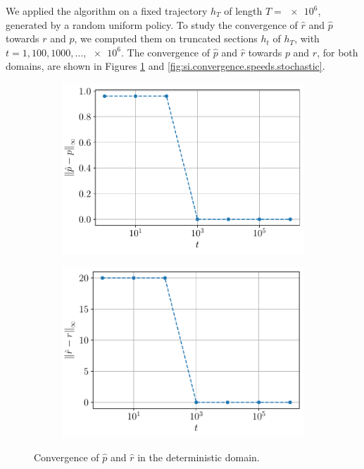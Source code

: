 \documentclass[a4paper, 12pt]{article}
\begin{document}
    We applied the algorithm on a fixed trajectory $h_T$ of length $T = \num{e6}$, generated by a random uniform policy. To study the convergence of $\hat{r}$ and $\hat{p}$ towards $r$ and $p$, we computed them on truncated sections $h_t$ of $h_T$, with $t = 1, 100, 1000, \dots, \num{e6}$. The convergence of $\hat{p}$ and $\hat{r}$ towards $p$ and $r$, for both domains, are shown in Figures \ref{fig:si.convergence.speeds.deterministic} and \ref{fig:si.convergence.speeds.stochastic}.
    
    \begin{figure}[H]
        \centering
        \begin{subfigure}[b]{0.47\textwidth}
            \centering
            \includegraphics[width=\textwidth]{resources/pdf/4_p_deterministic.pdf}
        \end{subfigure}
        \hfill
        \begin{subfigure}[b]{0.47\textwidth}
            \centering
            \includegraphics[width=\textwidth]{resources/pdf/4_r_deterministic.pdf}
        \end{subfigure}
        \caption{Convergence of $\hat{p}$ and $\hat{r}$ in the deterministic domain.}
        \label{fig:si.convergence.speeds.deterministic}
    \end{figure}
    
\end{document}
